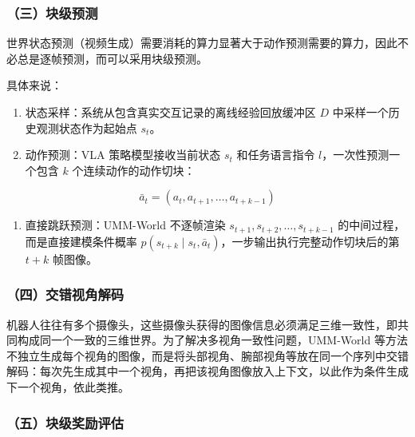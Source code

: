 \hypertarget{ux4e09ux5757ux7ea7ux9884ux6d4b}{%
\subsubsection{（三）块级预测}\label{ux4e09ux5757ux7ea7ux9884ux6d4b}}

世界状态预测（视频生成）需要消耗的算力显著大于动作预测需要的算力，因此不必总是逐帧预测，而可以采用块级预测。

具体来说：

\begin{enumerate}
\def\labelenumi{\arabic{enumi}.}
\tightlist
\item
  状态采样：系统从包含真实交互记录的离线经验回放缓冲区 \(D\) 中采样一个历史观测状态作为起始点 \(s_t\)。
\item
  动作预测：VLA 策略模型接收当前状态 \(s_t\) 和任务语言指令 \(l\)，一次性预测一个包含 \(k\) 个连续动作的动作切块：
\end{enumerate}

\[
\bar{a}_t = (a_t, a_{t+1}, \ldots, a_{t+k-1})
\]

\begin{enumerate}
\def\labelenumi{\arabic{enumi}.}
\setcounter{enumi}{2}
\tightlist
\item
  直接跳跃预测：UMM-World 不逐帧渲染 \(s_{t+1}, s_{t+2}, \ldots, s_{t+k-1}\) 的中间过程，而是直接建模条件概率 \(p(s_{t+k} \mid s_t, \bar{a}_t)\)，一步输出执行完整动作切块后的第 \(t+k\) 帧图像。
\end{enumerate}

\hypertarget{ux56dbux4ea4ux9519ux89c6ux89d2ux89e3ux7801}{%
\subsubsection{（四）交错视角解码}\label{ux56dbux4ea4ux9519ux89c6ux89d2ux89e3ux7801}}

机器人往往有多个摄像头，这些摄像头获得的图像信息必须满足三维一致性，即共同构成同一个一致的三维世界。为了解决多视角一致性问题，UMM-World 等方法不独立生成每个视角的图像，而是将头部视角、腕部视角等放在同一个序列中交错解码：每次先生成其中一个视角，再把该视角图像放入上下文，以此作为条件生成下一个视角，依此类推。

\hypertarget{ux4e94ux5757ux7ea7ux5956ux52b1ux8bc4ux4f30}{%
\subsubsection{（五）块级奖励评估}\label{ux4e94ux5757ux7ea7ux5956ux52b1ux8bc4ux4f30}}

